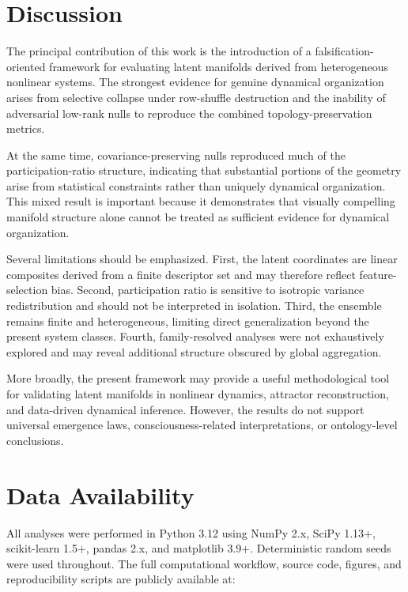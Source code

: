 \documentclass[%
 aip,
 chaos,
 amsmath,amssymb,
 reprint,
]{revtex4-2}
\begin{document}
\section{Discussion}

The principal contribution of this work is the introduction of a falsification-oriented framework for evaluating latent manifolds derived from heterogeneous nonlinear systems. The strongest evidence for genuine dynamical organization arises from selective collapse under row-shuffle destruction and the inability of adversarial low-rank nulls to reproduce the combined topology-preservation metrics.

At the same time, covariance-preserving nulls reproduced much of the participation-ratio structure, indicating that substantial portions of the geometry arise from statistical constraints rather than uniquely dynamical organization. This mixed result is important because it demonstrates that visually compelling manifold structure alone cannot be treated as sufficient evidence for dynamical organization.

Several limitations should be emphasized. First, the latent coordinates are linear composites derived from a finite descriptor set and may therefore reflect feature-selection bias. Second, participation ratio is sensitive to isotropic variance redistribution and should not be interpreted in isolation. Third, the ensemble remains finite and heterogeneous, limiting direct generalization beyond the present system classes. Fourth, family-resolved analyses were not exhaustively explored and may reveal additional structure obscured by global aggregation.

More broadly, the present framework may provide a useful methodological tool for validating latent manifolds in nonlinear dynamics, attractor reconstruction, and data-driven dynamical inference. However, the results do not support universal emergence laws, consciousness-related interpretations, or ontology-level conclusions.

\section{Data Availability}

All analyses were performed in Python 3.12 using NumPy 2.x, SciPy 1.13+, scikit-learn 1.5+, pandas 2.x, and matplotlib 3.9+. Deterministic random seeds were used throughout. The full computational workflow, source code, figures, and reproducibility scripts are publicly available at:
\end{document}
